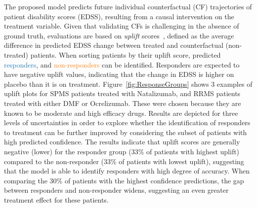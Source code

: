 \documentclass[runningheads]{llncs}
\newcommand{\blue}{\textcolor[HTML]{1f77b4}}
\newcommand{\orange}{\textcolor[HTML]{ff7f0e}}
\begin{document}
The proposed model predicts future individual counterfactual (CF) trajectories of patient disability scores (EDSS), resulting from a causal intervention on the treatment variable. Given that validating CFs is challenging in the absence of ground truth, evaluations are based on \textit{uplift} scores~\cite{Verhelst2023}, defined as the average difference in predicted EDSS change between treated and counterfactual (non-treated) patients. When sorting patients by their uplift score, predicted \blue{responders}, and \orange{non-responders} can be identified. Responders are expected to have negative uplift values, indicating that the change in EDSS is higher on placebo than it is on treatment. Figure~\ref{fig:ResponseGroups} shows 3 examples of uplift plots for SPMS patients treated with Natalizumab, and RRMS patients treated with either DMF or Ocrelizumab. These were chosen because they are known to be moderate and high efficacy drugs\cite{Montalban2017,DEFINEextendedstudy}. Results are depicted for three levels of uncertainties in order to explore whether the identification of responders to treatment can be further improved by considering the subset of patients with high predicted confidence. The results indicate that uplift scores are generally negative (lower) for the responder group (33\% of patients with highest uplift) compared to the non-responder (33\% of patients with lowest uplift), suggesting that the model is able to identify responders with high degree of accuracy. When comparing the 30\% of patients with the highest confidence predictions, the gap between responders and non-responder widens, suggesting an even greater treatment effect for these patients.
\end{document}
